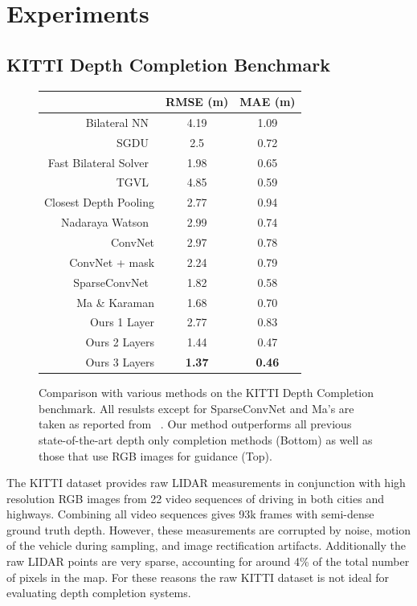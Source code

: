 \section{Experiments}
\subsection{KITTI Depth Completion Benchmark}
\label{sec:kitti-depth-compl}
\begin{figure}
\begin{tabular}{r|cc}
  \label{table:kitti}
  & RMSE (m) & MAE (m)\\\hline
  Bilateral NN~\cite{} & 4.19 & 1.09\\
  SGDU~\cite{} & 2.5 & 0.72\\
  Fast Bilateral Solver~\cite{} & 1.98 & 0.65\\
  TGVL~\cite{} & 4.85 & 0.59\\\hline
  Closest Depth Pooling & 2.77 & 0.94\\
  Nadaraya Watson~\cite{} & 2.99 & 0.74\\
  ConvNet & 2.97 & 0.78\\
  ConvNet + mask & 2.24 & 0.79\\
  SparseConvNet~\cite{} & 1.82 & 0.58\\
  Ma \& Karaman & 1.68 & 0.70\\
  Ours 1 Layer & 2.77 & 0.83\\
  Ours 2 Layers & 1.44 & 0.47\\
  Ours 3 Layers & \textbf{1.37} & \textbf{0.46}
\end{tabular}

\caption{Comparison with various methods on the KITTI Depth Completion benchmark. All resulsts except for SparseConvNet and Ma's are taken as reported from ~\cite{}. Our method outperforms all previous state-of-the-art depth only completion methods (Bottom) as well as those that use RGB images for guidance (Top).}
\label{fig:kitti}
\end{figure}

The KITTI dataset provides raw LIDAR measurements in conjunction with high resolution RGB images from 22 video sequences of driving in both cities and highways. Combining all video sequences gives 93k frames with semi-dense ground truth depth. However, these measurements are corrupted by noise, motion of the vehicle during sampling, and image rectification artifacts. Additionally the raw LIDAR points are very sparse, accounting for around 4\% of the total number of pixels in the map. For these reasons the raw KITTI dataset is not ideal for evaluating depth completion systems.\\

